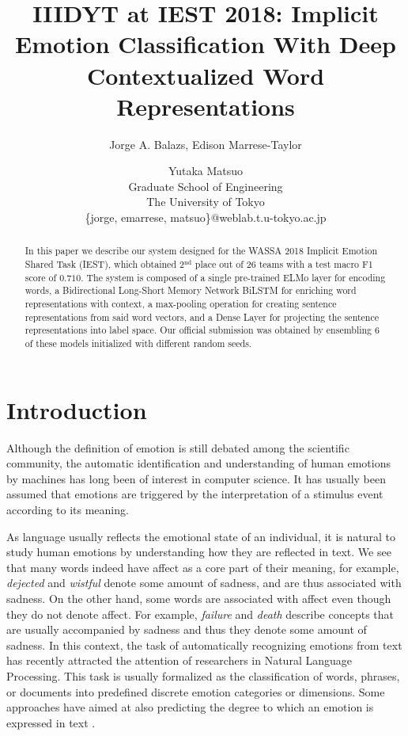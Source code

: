 \documentclass[11pt,a4paper]{article}
\title{IIIDYT at IEST 2018: Implicit Emotion Classification With Deep
Contextualized Word Representations}
\author{Jorge A. Balazs, Edison Marrese-Taylor \and Yutaka Matsuo \\
  Graduate School of Engineering\\
  The University of Tokyo\\
  \{jorge, emarrese, matsuo\}@weblab.t.u-tokyo.ac.jp \\
}
\date{}
\begin{document}
\maketitle
\begin{abstract}
In this paper we describe our system designed for the WASSA 2018 Implicit Emotion Shared Task (IEST), which obtained 2$^{\text{nd}}$ place out of 26 teams with a test macro F1 score of $0.710$. The system is composed of a single pre-trained ELMo layer for encoding words, a Bidirectional Long-Short Memory Network BiLSTM for enriching word representations with context, a max-pooling operation for creating sentence representations from said word vectors, and a Dense Layer for projecting the sentence representations into label space. Our official submission was obtained by ensembling 6 of these models initialized with different random seeds.
\end{abstract}

\section{Introduction}

Although the definition of emotion is still debated among the scientific community, the automatic identification and understanding of human emotions by machines has long been of interest in computer science. It has usually been assumed that emotions are triggered by the interpretation of a stimulus event according to its meaning. 

As language usually reflects the emotional state of an individual, it is natural to study human emotions by understanding how they are reflected in text. We see that many words indeed have affect as a core part of their meaning, for example, \textit{dejected} and \textit{wistful} denote some amount of sadness, and are thus associated with sadness. On the other hand, some words are associated with affect even though they do not denote affect. For example, \textit{failure} and \textit{death} describe concepts that are usually accompanied by sadness and thus they denote some amount of sadness. In this context, the task of automatically recognizing emotions from text has recently attracted the attention of researchers in Natural Language Processing. This task is usually formalized as the classification of words, phrases, or documents into predefined discrete emotion categories or dimensions. Some approaches have aimed at also predicting the degree to which an emotion is expressed in text \cite{wassa_emoint_2017}.
\end{document}

